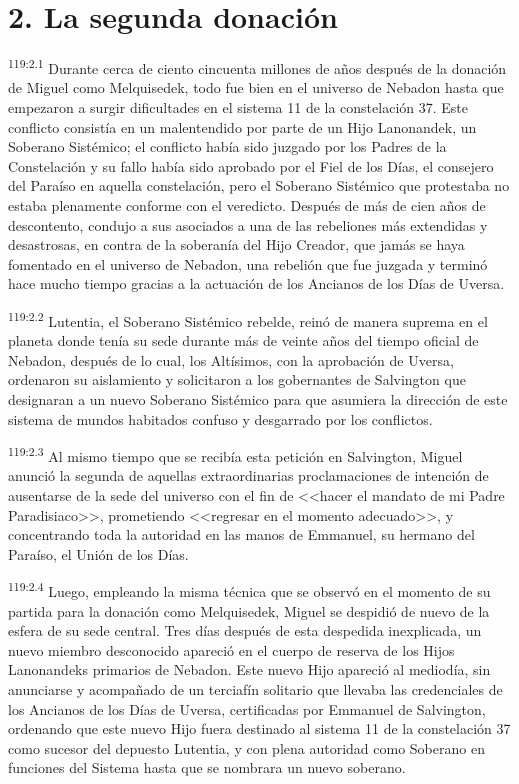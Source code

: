 \section*{2. La segunda donación}
\par
\textsuperscript{119:2.1} Durante cerca de ciento cincuenta millones de años después de la donación de Miguel como Melquisedek, todo fue bien en el universo de Nebadon hasta que empezaron a surgir dificultades en el sistema 11 de la constelación 37. Este conflicto consistía en un malentendido por parte de un Hijo Lanonandek, un Soberano Sistémico; el conflicto había sido juzgado por los Padres de la Constelación y su fallo había sido aprobado por el Fiel de los Días, el consejero del Paraíso en aquella constelación, pero el Soberano Sistémico que protestaba no estaba plenamente conforme con el veredicto. Después de más de cien años de descontento, condujo a sus asociados a una de las rebeliones más extendidas y desastrosas, en contra de la soberanía del Hijo Creador, que jamás se haya fomentado en el universo de Nebadon, una rebelión que fue juzgada y terminó hace mucho tiempo gracias a la actuación de los Ancianos de los Días de Uversa.

\par
\textsuperscript{119:2.2} Lutentia, el Soberano Sistémico rebelde, reinó de manera suprema en el planeta donde tenía su sede durante más de veinte años del tiempo oficial de Nebadon, después de lo cual, los Altísimos, con la aprobación de Uversa, ordenaron su aislamiento y solicitaron a los gobernantes de Salvington que designaran a un nuevo Soberano Sistémico para que asumiera la dirección de este sistema de mundos habitados confuso y desgarrado por los conflictos.

\par
\textsuperscript{119:2.3} Al mismo tiempo que se recibía esta petición en Salvington, Miguel anunció la segunda de aquellas extraordinarias proclamaciones de intención de ausentarse de la sede del universo con el fin de <<hacer el mandato de mi Padre Paradisiaco>>, prometiendo <<regresar en el momento adecuado>>, y concentrando toda la autoridad en las manos de Emmanuel, su hermano del Paraíso, el Unión de los Días.

\par
\textsuperscript{119:2.4} Luego, empleando la misma técnica que se observó en el momento de su partida para la donación como Melquisedek, Miguel se despidió de nuevo de la esfera de su sede central. Tres días después de esta despedida inexplicada, un nuevo miembro desconocido apareció en el cuerpo de reserva de los Hijos Lanonandeks primarios de Nebadon. Este nuevo Hijo apareció al mediodía, sin anunciarse y acompañado de un terciafín solitario que llevaba las credenciales de los Ancianos de los Días de Uversa, certificadas por Emmanuel de Salvington, ordenando que este nuevo Hijo fuera destinado al sistema 11 de la constelación 37 como sucesor del depuesto Lutentia, y con plena autoridad como Soberano en funciones del Sistema hasta que se nombrara un nuevo soberano.

